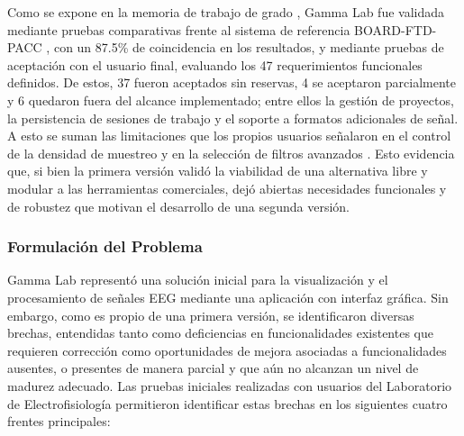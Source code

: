 \documentclass[12pt,letterpaper,oneside]{article}
\begin{document}
Como se expone en la memoria de trabajo de grado \cite{asencio2025}, Gamma Lab fue validada mediante pruebas comparativas frente al sistema de referencia BOARD-FTD-PACC \cite{gauthier2023}, con un 87.5\% de coincidencia en los resultados, y mediante pruebas de aceptación con el usuario final, evaluando los 47 requerimientos funcionales definidos. De estos, 37 fueron aceptados sin reservas, 4 se aceptaron parcialmente y 6 quedaron fuera del alcance implementado; entre ellos la gestión de proyectos, la persistencia de sesiones de trabajo y el soporte a formatos adicionales de señal. A esto se suman las limitaciones que los propios usuarios señalaron en el control de la densidad de muestreo y en la selección de filtros avanzados \cite{asencio2025}. Esto evidencia que, si bien la primera versión validó la viabilidad de una alternativa libre y modular a las herramientas comerciales, dejó abiertas necesidades funcionales y de robustez que motivan el desarrollo de una segunda versión.

\subsubsection{Formulación del Problema}

Gamma Lab \cite{asencio2025} representó una solución inicial para la visualización y el procesamiento de señales EEG mediante una aplicación con interfaz gráfica. Sin embargo, como es propio de una primera versión, se identificaron diversas brechas, entendidas tanto como deficiencias en funcionalidades existentes que requieren corrección como oportunidades de mejora asociadas a funcionalidades ausentes, o presentes de manera parcial y que aún no alcanzan un nivel de madurez adecuado. Las pruebas iniciales realizadas con usuarios del Laboratorio de Electrofisiología permitieron identificar estas brechas en los siguientes cuatro frentes principales:
\end{document}
